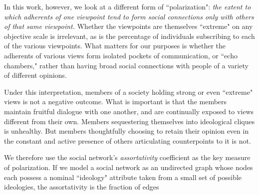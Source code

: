 In this work, however, we look at a different form of ``polarization":
\textit{the extent to which adherents of one viewpoint tend to form social
connections only with others of that same viewpoint.} Whether the viewpoints
are themselves ``extreme" on any objective scale is irrelevant, as is the
percentage of individuals subscribing to each of the various viewpoints. What
matters for our purposes is whether the adherents of various views form
isolated pockets of communication, or ``echo chambers," rather than having
broad social connections with people of a variety of different opinions.

Under this interpretation, members of a society holding strong or even
``extreme" views is not a negative outcome. What is important is that the
members maintain fruitful dialogue with one another, and are continually
exposed to views different from their own. Members sequestering themselves
into ideological cliques is unhealthy. But members thoughtfully choosing
to retain their opinion even in the constant and active presence of others
articulating counterpoints to it is not.

We therefore use the social network's \textit{assortativity}
coefficient\cite{newman} as the key measure of polarization. If we model a
social network as an undirected graph whose nodes each possess a nominal
``ideology" attribute taken from a small set of possible ideologies, the
assortativity is the fraction of edges 
